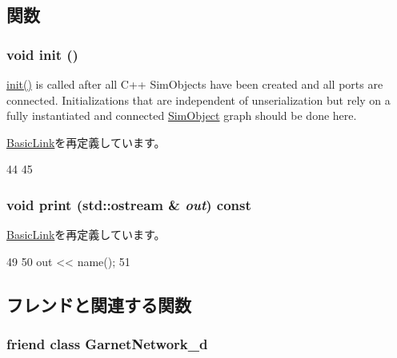 \subsection{関数}
\hypertarget{classGarnetIntLink__d_a02fd73d861ef2e4aabb38c0c9ff82947}{
\subsubsection[{init}]{\setlength{\rightskip}{0pt plus 5cm}void init ()}}
\label{classGarnetIntLink__d_a02fd73d861ef2e4aabb38c0c9ff82947}
\hyperlink{classGarnetIntLink__d_a02fd73d861ef2e4aabb38c0c9ff82947}{init()} is called after all C++ SimObjects have been created and all ports are connected. Initializations that are independent of unserialization but rely on a fully instantiated and connected \hyperlink{classSimObject}{SimObject} graph should be done here. 

\hyperlink{classBasicLink_a02fd73d861ef2e4aabb38c0c9ff82947}{BasicLink}を再定義しています。


\begin{DoxyCode}
44 {
45 }
\end{DoxyCode}
\hypertarget{classGarnetIntLink__d_ac55fe386a101fbae38c716067c9966a0}{
\subsubsection[{print}]{\setlength{\rightskip}{0pt plus 5cm}void print (std::ostream \& {\em out}) const}}
\label{classGarnetIntLink__d_ac55fe386a101fbae38c716067c9966a0}


\hyperlink{classBasicLink_ac55fe386a101fbae38c716067c9966a0}{BasicLink}を再定義しています。


\begin{DoxyCode}
49 {
50     out << name();
51 }
\end{DoxyCode}


\subsection{フレンドと関連する関数}
\hypertarget{classGarnetIntLink__d_a38cee00c4f7913bbde36a9724f8d4075}{
\subsubsection[{GarnetNetwork\_\-d}]{\setlength{\rightskip}{0pt plus 5cm}friend class {\bf GarnetNetwork\_\-d}}}
\label{classGarnetIntLink__d_a38cee00c4f7913bbde36a9724f8d4075}


